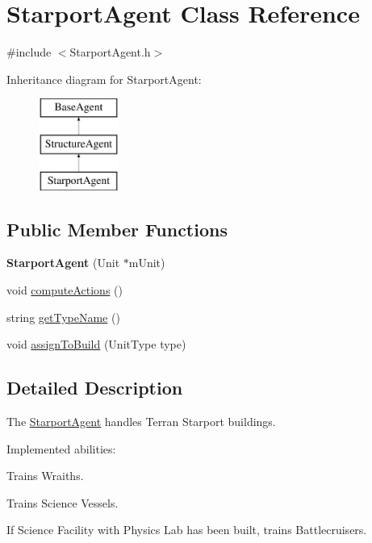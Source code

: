 \hypertarget{class_starport_agent}{
\section{StarportAgent Class Reference}
\label{class_starport_agent}
}


{\ttfamily \#include $<$StarportAgent.h$>$}

Inheritance diagram for StarportAgent:\begin{figure}[H]
\begin{center}
\leavevmode
\includegraphics[height=3.000000cm]{class_starport_agent}
\end{center}
\end{figure}
\subsection*{Public Member Functions}
\begin{DoxyCompactItemize}
\item 
\hypertarget{class_starport_agent_a2864a89ed1da4f11822af16ec69ea8ec}{
{\bfseries StarportAgent} (Unit $\ast$mUnit)}
\label{class_starport_agent_a2864a89ed1da4f11822af16ec69ea8ec}

\item 
void \hyperlink{class_starport_agent_a1ddbcc07b46782ed6b4e9874e6603201}{computeActions} ()
\item 
string \hyperlink{class_starport_agent_a9c898199b9060db855f75f331187de69}{getTypeName} ()
\item 
void \hyperlink{class_starport_agent_a01d22b2d1476f1f484c18e1781d6aab1}{assignToBuild} (UnitType type)
\end{DoxyCompactItemize}


\subsection{Detailed Description}
The \hyperlink{class_starport_agent}{StarportAgent} handles Terran Starport buildings.

Implemented abilities:
\begin{DoxyItemize}
\item Trains Wraiths.
\item Trains Science Vessels.
\item If Science Facility with Physics Lab has been built, trains Battlecruisers.
\end{DoxyItemize}

